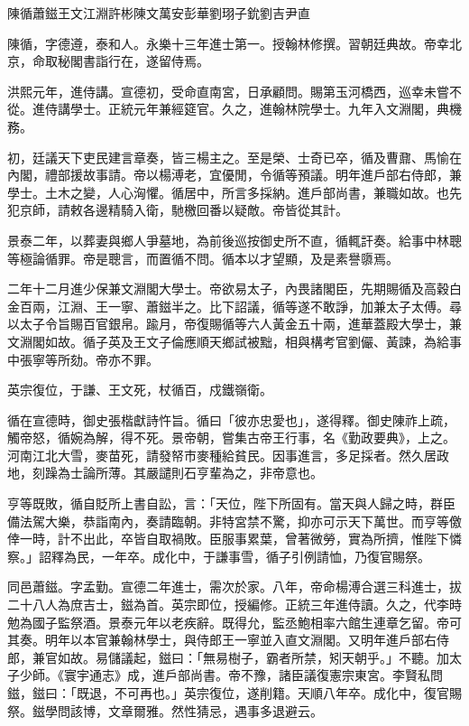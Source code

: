 
\begin{pinyinscope}
陳循蕭鎡王文江淵許彬陳文萬安彭華劉珝子鈗劉吉尹直

陳循，字德遵，泰和人。永樂十三年進士第一。授翰林修撰。習朝廷典故。帝幸北京，命取秘閣書詣行在，遂留侍焉。

洪熙元年，進侍講。宣德初，受命直南宮，日承顧問。賜第玉河橋西，巡幸未嘗不從。進侍講學士。正統元年兼經筵官。久之，進翰林院學士。九年入文淵閣，典機務。

初，廷議天下吏民建言章奏，皆三楊主之。至是榮、士奇已卒，循及曹鼐、馬愉在內閣，禮部援故事請。帝以楊溥老，宜優閒，令循等預議。明年進戶部右侍郎，兼學士。土木之變，人心洶懼。循居中，所言多採納。進戶部尚書，兼職如故。也先犯京師，請敕各邊精騎入衛，馳檄回番以疑敵。帝皆從其計。

景泰二年，以葬妻與鄉人爭墓地，為前後巡按御史所不直，循輒訐奏。給事中林聰等極論循罪。帝是聰言，而置循不問。循本以才望顯，及是素譽隳焉。

二年十二月進少保兼文淵閣大學士。帝欲易太子，內畏諸閣臣，先期賜循及高穀白金百兩，江淵、王一寧、蕭鎡半之。比下詔議，循等遂不敢諍，加兼太子太傅。尋以太子令旨賜百官銀帛。踰月，帝復賜循等六人黃金五十兩，進華蓋殿大學士，兼文淵閣如故。循子英及王文子倫應順天鄉試被黜，相與構考官劉儼、黃諫，為給事中張寧等所劾。帝亦不罪。

英宗復位，于謙、王文死，杖循百，戍鐵嶺衛。

循在宣德時，御史張楷獻詩忤旨。循曰「彼亦忠愛也」，遂得釋。御史陳祚上疏，觸帝怒，循婉為解，得不死。景帝朝，嘗集古帝王行事，名《勤政要典》，上之。河南江北大雪，麥苗死，請發帑市麥種給貧民。因事進言，多足採者。然久居政地，刻躁為士論所薄。其嚴譴則石亨輩為之，非帝意也。

亨等既敗，循自貶所上書自訟，言：「天位，陛下所固有。當天與人歸之時，群臣備法駕大樂，恭詣南內，奏請臨朝。非特宮禁不驚，抑亦可示天下萬世。而亨等儌倖一時，計不出此，卒皆自取禍敗。臣服事累葉，曾著微勞，實為所擠，惟陛下憐察。」詔釋為民，一年卒。成化中，于謙事雪，循子引例請恤，乃復官賜祭。

同邑蕭鎡。字孟勤。宣德二年進士，需次於家。八年，帝命楊溥合選三科進士，拔二十八人為庶吉士，鎡為首。英宗即位，授編修。正統三年進侍讀。久之，代李時勉為國子監祭酒。景泰元年以老疾辭。既得允，監丞鮑相率六館生連章乞留。帝可其奏。明年以本官兼翰林學士，與侍郎王一寧並入直文淵閣。又明年進戶部右侍郎，兼官如故。易儲議起，鎡曰：「無易樹子，霸者所禁，矧天朝乎。」不聽。加太子少師。《寰宇通志》成，進戶部尚書。帝不豫，諸臣議復憲宗東宮。李賢私問鎡，鎡曰：「既退，不可再也。」英宗復位，遂削籍。天順八年卒。成化中，復官賜祭。鎡學問該博，文章爾雅。然性猜忌，遇事多退避云。


\end{pinyinscope}
